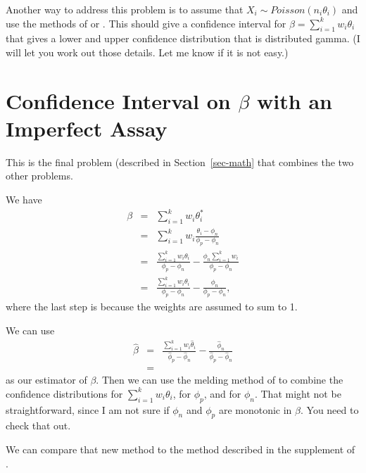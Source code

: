 \documentclass{article}
\begin{document}
Another way to address this problem is to assume that $X_i \sim Poisson( n_i \theta_i)$ and use the methods 
of \citet{FayF:1997} or \citet{FayK:2017}. This should give a confidence interval for $\beta=\sum_{i=1}^{k} w_i \theta_i$ 
that gives a lower and upper confidence distribution that is distributed gamma. (I will let you work out those details. Let me know if it is not easy.)  


\section{Confidence Interval on $\beta$ with an Imperfect Assay}
\label{sec-betaImperfect}

This is the final problem (described in Section~\ref{sec-math} that combines the two other problems.

We have 
\begin{eqnarray*}
\beta & = & \sum_{i=1}^{k} w_i \theta_i^*  \\
& = &  \sum_{i=1}^{k} w_i  \frac{ \theta_i - \phi_n }{ \phi_p - \phi_n} \\
& = &   \frac{ \sum_{i=1}^{k} w_i  \theta_i  }{ \phi_p - \phi_n} - \frac{ \phi_n \sum_{i=1}^{k} w_i    }{ \phi_p - \phi_n} \\
& = &   \frac{ \sum_{i=1}^{k} w_i  \theta_i  }{ \phi_p - \phi_n} - \frac{ \phi_n     }{ \phi_p - \phi_n},
\end{eqnarray*}
where the last step is because the weights are assumed to sum to 1. 

We can use 
\begin{eqnarray*}
\hat{\beta} & = &   \frac{ \sum_{i=1}^{k} w_i  \hat{\theta}_i  }{ \hat{\phi}_p - \hat{\phi}_n} - \frac{ \hat{\phi}_n   }{ \hat{\phi}_p - \hat{\phi}_n} \\
& = & 
\end{eqnarray*}
as our estimator of $\beta$. Then we can use the melding method of \citet{FayP:2015} to combine the confidence distributions for $\sum_{i=1}^{k} w_i  {\theta}_i$, for $\phi_p$,
and for $\phi_n$. That might not be straightforward, since I am not sure if $\phi_n$ and $\phi_p$ are monotonic in $\beta$. You need to check that out.


We can compare that new method to the method described in the supplement of \citet{Kali:2021}.




%




\end{document}
